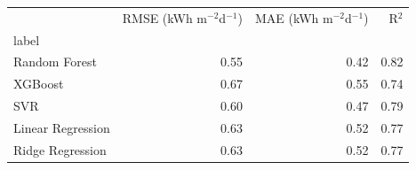 \begin{tabular}{lrrr}
\toprule
 & RMSE (kWh m$^{-2}$d$^{-1}$) & MAE (kWh m$^{-2}$d$^{-1}$) & R$^2$ \\
label &  &  &  \\
\midrule
Random Forest & 0.55 & 0.42 & 0.82 \\
XGBoost & 0.67 & 0.55 & 0.74 \\
SVR & 0.60 & 0.47 & 0.79 \\
Linear Regression & 0.63 & 0.52 & 0.77 \\
Ridge Regression & 0.63 & 0.52 & 0.77 \\
\bottomrule
\end{tabular}
